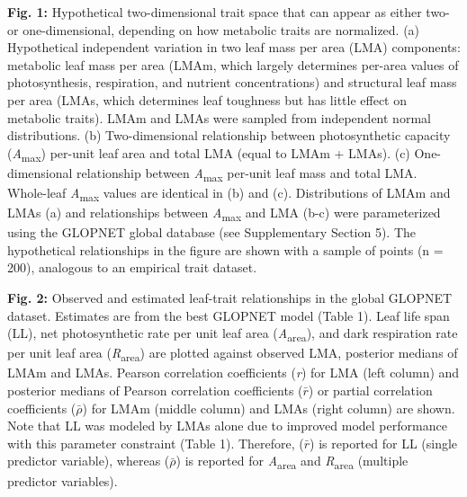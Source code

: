 \documentclass[
  12pt,
  letterpaper,
  DIV=11,
  numbers=noendperiod]{scrartcl}
\begin{document}
\begin{figure}

\centering{

}

\caption{\label{fig-hypo}}

\end{figure}%

\textbf{Fig. 1:} Hypothetical two-dimensional trait space that can
appear as either two- or one-dimensional, depending on how metabolic
traits are normalized. (a) Hypothetical independent variation in two
leaf mass per area (LMA) components: metabolic leaf mass per area (LMAm,
which largely determines per-area values of photosynthesis, respiration,
and nutrient concentrations) and structural leaf mass per area (LMAs,
which determines leaf toughness but has little effect on metabolic
traits). LMAm and LMAs were sampled from independent normal
distributions. (b) Two-dimensional relationship between photosynthetic
capacity (\emph{A}\textsubscript{max}) per-unit leaf area and total LMA
(equal to LMAm + LMAs). (c) One-dimensional relationship between
\emph{A}\textsubscript{max} per-unit leaf mass and total LMA. Whole-leaf
\emph{A}\textsubscript{max} values are identical in (b) and (c).
Distributions of LMAm and LMAs (a) and relationships between
\emph{A}\textsubscript{max} and LMA (b-c) were parameterized using the
GLOPNET global database (see Supplementary Section 5). The hypothetical
relationships in the figure are shown with a sample of points (n = 200),
analogous to an empirical trait dataset.

\begin{figure}

\centering{

}

\caption{\label{fig-gl_point}}

\end{figure}%

\textbf{Fig. 2:} Observed and estimated leaf-trait relationships in the
global GLOPNET dataset. Estimates are from the best GLOPNET model (Table
1). Leaf life span (LL), net photosynthetic rate per unit leaf area
(\emph{A}\textsubscript{area}), and dark respiration rate per unit leaf
area (\emph{R}\textsubscript{area}) are plotted against observed LMA,
posterior medians of LMAm and LMAs. Pearson correlation coefficients
(\emph{r}) for LMA (left column) and posterior medians of Pearson
correlation coefficients (\(\bar{r}\)) or partial correlation
coefficients (\(\bar{\rho}\)) for LMAm (middle column) and LMAs (right
column) are shown. Note that LL was modeled by LMAs alone due to
improved model performance with this parameter constraint (Table 1).
Therefore, (\(\bar{r}\)) is reported for LL (single predictor variable),
whereas (\(\bar{\rho}\)) is reported for \emph{A}\textsubscript{area}
and \emph{R}\textsubscript{area} (multiple predictor variables).
\end{document}
